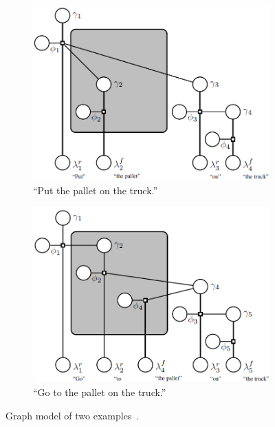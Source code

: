 \documentclass[phd]{byuprop}
\begin{document}
\begin{figure}[htbp]
	\centering
	\begin{subfigure}[t]{0.45\linewidth}
		\centering
		\includegraphics[width=\textwidth]{fig/Induction1}
		\caption{``Put the pallet on the truck.''}
		\label{fig:graph_model:induction1}
	\end{subfigure}  
	\begin{subfigure}[t]{0.45\linewidth}
		\centering
		\includegraphics[width=\textwidth]{fig/Induction2}
		\caption{``Go to the pallet on the truck.''}
		\label{fig:graph_model:induction2}
	\end{subfigure}   
	\caption{Graph model of two examples~\cite{tellex2011understanding}.}
	\label{fig:graph_model:induction}
\end{figure}
\end{document}
